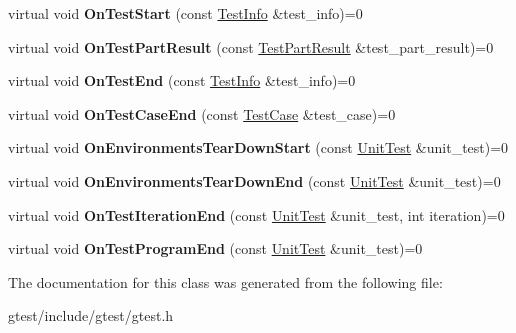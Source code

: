 \begin{DoxyCompactItemize}
virtual void {\bfseries On\+Test\+Start} (const \hyperlink{classtesting_1_1TestInfo}{Test\+Info} \&test\+\_\+info)=0
\item 
\mbox{\label{classtesting_1_1TestEventListener_a054f8705c883fa120b91473aff38f2ee}} 
virtual void {\bfseries On\+Test\+Part\+Result} (const \hyperlink{classtesting_1_1TestPartResult}{Test\+Part\+Result} \&test\+\_\+part\+\_\+result)=0
\item 
\mbox{\label{classtesting_1_1TestEventListener_abb1c44525ef038500608b5dc2f17099b}} 
virtual void {\bfseries On\+Test\+End} (const \hyperlink{classtesting_1_1TestInfo}{Test\+Info} \&test\+\_\+info)=0
\item 
\mbox{\label{classtesting_1_1TestEventListener_ae61985e2ef76ac78379b077be57a9c36}} 
virtual void {\bfseries On\+Test\+Case\+End} (const \hyperlink{classtesting_1_1TestCase}{Test\+Case} \&test\+\_\+case)=0
\item 
\mbox{\label{classtesting_1_1TestEventListener_a468b5e6701bcb86cb2c956caadbba5e4}} 
virtual void {\bfseries On\+Environments\+Tear\+Down\+Start} (const \hyperlink{classtesting_1_1UnitTest}{Unit\+Test} \&unit\+\_\+test)=0
\item 
\mbox{\label{classtesting_1_1TestEventListener_a9ea04fa7f447865ba76df35e12ba2092}} 
virtual void {\bfseries On\+Environments\+Tear\+Down\+End} (const \hyperlink{classtesting_1_1UnitTest}{Unit\+Test} \&unit\+\_\+test)=0
\item 
\mbox{\label{classtesting_1_1TestEventListener_a550fdb3e55726e4cefa09f5697941425}} 
virtual void {\bfseries On\+Test\+Iteration\+End} (const \hyperlink{classtesting_1_1UnitTest}{Unit\+Test} \&unit\+\_\+test, int iteration)=0
\item 
\mbox{\label{classtesting_1_1TestEventListener_ad15b6246d94c268e233487a86463ef3d}} 
virtual void {\bfseries On\+Test\+Program\+End} (const \hyperlink{classtesting_1_1UnitTest}{Unit\+Test} \&unit\+\_\+test)=0
\end{DoxyCompactItemize}


The documentation for this class was generated from the following file\+:\begin{DoxyCompactItemize}
\item 
gtest/include/gtest/gtest.\+h\end{DoxyCompactItemize}
